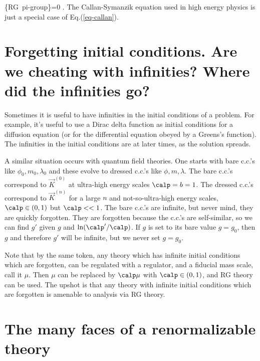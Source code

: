 \beq
{}
\{\mbox{\rm RG pi-group}\}=0
\;.
\label{eq-callan}
\eeq
The Callan-Symanzik equation
used in high energy physics is
just a special case of Eq.(\ref{eq-callan}).



\section{Forgetting initial conditions.
Are we cheating with infinities?
Where did the infinities go?}

Sometimes it is useful
to have infinities in the
initial conditions of a problem.
For example, it's
useful to use a Dirac delta function
as initial conditions
for a diffusion equation
(or for the differential
equation obeyed by a Greens's function).
The infinities in the initial
conditions are 
 at later times,
as the solution spreads.

A similar situation occurs with
quantum field theories. One starts
with bare c.c.'s like $\phi_0, m_0, \lambda_0$
and these evolve to dressed c.c.'s
like $\phi, m, \lambda$.
The bare
c.c.'s correspond to $\vec{K}^{(0)}$
at ultra-high energy scales $\calp= b=1$.
The dressed c.c.'s
 correspond to $\vec{K}^{(n)}$
for a large $n$
and not-so-ultra-high energy scales,
$\calp\in (0,1)$ but $\calp<<1$.
The bare c.c.'s are
infinite, but never mind, they are
quickly forgotten.
They are forgotten
because the c.c.'s are self-similar,
so we can find $g'$ given
$g$ and $\ln(\calp'/\calp)$.
If $g$ is set
to its bare value $g=g_0$,
then $g$ and therefore $g'$
will be infinite, but
we never set $g=g_0$.

Note that by the same
token, any theory which
has infinite initial conditions
which are forgotten,
can be regulated with a regulator,
and a fiducial mass scale, call it $\mu$. Then
$\mu$ can be replaced
by $\calp\mu$ with $\calp\in(0,1)$,
and RG theory can be used.
The upshot is that any
theory with infinite initial
conditions which are forgotten
is amenable to analysis
via RG theory.




\section{The many faces of a renormalizable theory}

